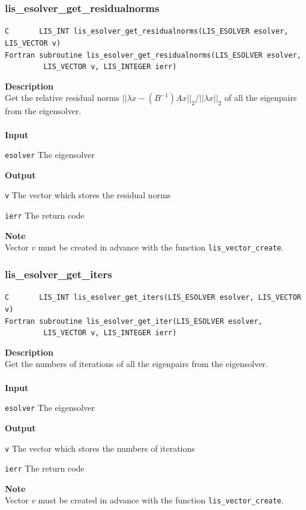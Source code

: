 \documentclass[a4paper]{article}
\newcommand{\namelistlabel}[1]{\mbox{#1}\hfill}
\newenvironment{namelist}[1]{%
\begin{list}{}
  {\let\makelabel\namelistlabel
  \settowidth{\labelwidth}{#1}
  \setlength{\leftmargin}{1.1\labelwidth}}
  }{%
\end{list}}
\begin{document}
\subsubsection{lis\_esolver\_get\_residualnorms}
\begin{screen}
\verb|C       LIS_INT lis_esolver_get_residualnorms(LIS_ESOLVER esolver, LIS_VECTOR v)|\\
\verb|Fortran subroutine lis_esolver_get_residualnorms(LIS_ESOLVER esolver,|\\
\verb|         LIS_VECTOR v, LIS_INTEGER ierr)|
\end{screen}
{\bf Description}\\
\indent
Get the relative residual norms $||\lambda x-(B^{-1})Ax||_2/||\lambda x||_2$ of all the eigenpairs from the eigensolver.
\\ \\
\noindent
{\bf Input}
\begin{namelist}{XXXXXXXXXXXXXXXXXXXX}
\item[\tt esolver] The eigensolver
\end{namelist}
{\bf Output}
\begin{namelist}{XXXXXXXXXXXXXXXXXXXX}
\item[\tt v]  The vector which stores the residual norms
\item[\tt ierr] The return code
\end{namelist}
{\bf Note}\\
\indent
Vector $v$ must be created in advance with the function \verb|lis_vector_create|. 

\newpage
\subsubsection{lis\_esolver\_get\_iters}
\begin{screen}
\verb|C       LIS_INT lis_esolver_get_iters(LIS_ESOLVER esolver, LIS_VECTOR v)|\\
\verb|Fortran subroutine lis_esolver_get_iter(LIS_ESOLVER esolver, |\\
\verb|         LIS_VECTOR v, LIS_INTEGER ierr)|
\end{screen}
{\bf Description}\\
\indent
Get the numbers of iterations of all the eigenpairs from the eigensolver.
\\ \\
\noindent
{\bf Input}
\begin{namelist}{XXXXXXXXXXXXXXXXXXXX}
\item[\tt esolver] The eigensolver
\end{namelist}
{\bf Output}
\begin{namelist}{XXXXXXXXXXXXXXXXXXXX}
\item[\tt v]  The vector which stores the numbers of iterations
\item[\tt ierr] The return code
\end{namelist}
{\bf Note}\\
\indent
Vector $v$ must be created in advance with the function \verb|lis_vector_create|. 
\end{document}
